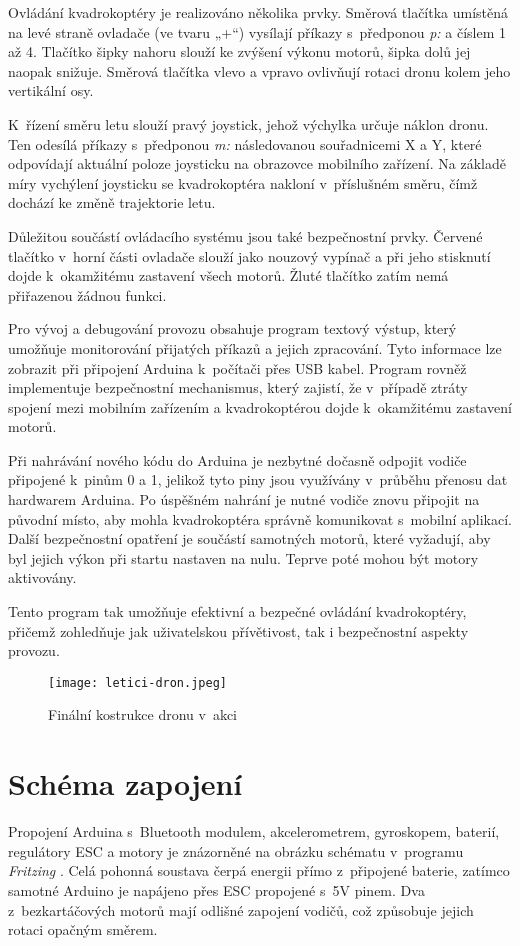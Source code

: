 \documentclass[12pt]{report}
\begin{document}
Ovládání kvadrokoptéry je realizováno několika prvky. Směrová tlačítka umístěná na levé straně ovladače (ve tvaru „+“) vysílají příkazy s~předponou \textit{p:} a číslem 1 až 4. Tlačítko šipky nahoru slouží ke zvýšení výkonu motorů, šipka dolů jej naopak snižuje. Směrová tlačítka vlevo a vpravo ovlivňují rotaci dronu kolem jeho vertikální osy.

K~řízení směru letu slouží pravý joystick, jehož výchylka určuje náklon dronu. Ten odesílá příkazy s~předponou \textit{m:} následovanou souřadnicemi X a Y, které odpovídají aktuální poloze joysticku na obrazovce mobilního zařízení. Na základě míry vychýlení joysticku se kvadrokoptéra nakloní v~příslušném směru, čímž dochází ke změně trajektorie letu.

Důležitou součástí ovládacího systému jsou také bezpečnostní prvky. Červené tlačítko v~horní části ovladače slouží jako nouzový vypínač a při jeho stisknutí dojde k~okamžitému zastavení všech motorů. Žluté tlačítko zatím nemá přiřazenou žádnou funkci.

Pro vývoj a debugování provozu obsahuje program textový výstup, který umožňuje monitorování přijatých příkazů a jejich zpracování. Tyto informace lze zobrazit při připojení Arduina k~počítači přes USB kabel. Program rovněž implementuje bezpečnostní mechanismus, který zajistí, že v~případě ztráty spojení mezi mobilním zařízením a kvadrokoptérou dojde k~okamžitému zastavení motorů.

Při nahrávání nového kódu do Arduina je nezbytné dočasně odpojit vodiče připojené k~pinům 0 a 1, jelikož tyto piny jsou využívány v~průběhu přenosu dat hardwarem Arduina. Po úspěšném nahrání je nutné vodiče znovu připojit na původní místo, aby mohla kvadrokoptéra správně komunikovat s~mobilní aplikací. Další bezpečnostní opatření je součástí samotných motorů, které vyžadují, aby byl jejich výkon při startu nastaven na nulu. Teprve poté mohou být motory aktivovány.

Tento program tak umožňuje efektivní a bezpečné ovládání kvadrokoptéry, přičemž zohledňuje jak uživatelskou přívětivost, tak i bezpečnostní aspekty provozu.

\begin{figure}[H]
	\centering
	\texttt{[image: letici-dron.jpeg]}
	\caption{Finální kostrukce dronu v~akci}
	\label{fig:letici-dron.jpeg}
\end{figure}

\chapter[Schéma zapojení]{Schéma zapojení}
Propojení Arduina s~Bluetooth modulem, akcelerometrem, gyroskopem, baterií, regulátory ESC a motory je znázorněné na obrázku schématu v~programu \textit{Fritzing} \cite{fritzing}. Celá pohonná soustava čerpá energii přímo z~připojené baterie, zatímco samotné Arduino je napájeno přes ESC propojené s~5V pinem. Dva z~bezkartáčových motorů mají odlišné zapojení vodičů, což způsobuje jejich rotaci opačným směrem.
\end{document}

